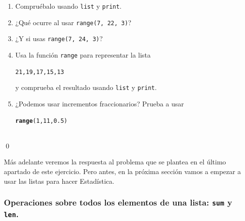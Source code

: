 \documentclass[10pt,a4paper]{article}\usepackage[]{graphicx}\usepackage[]{color}
\makeatletter
\newcommand{\hlnum}[1]{\textcolor[rgb]{0.686,0.059,0.569}{#1}}%
\newcommand{\hlstd}[1]{\textcolor[rgb]{0.345,0.345,0.345}{#1}}%
\newcommand{\hlkwd}[1]{\textcolor[rgb]{0.737,0.353,0.396}{\textbf{#1}}}%
\newenvironment{kframe}{%
 \def\at@end@of@kframe{}%
 \ifinner\ifhmode%
  \def\at@end@of@kframe{\end{minipage}}%
  \begin{minipage}{\columnwidth}%
 \fi\fi%
 \def\FrameCommand##1{\hskip\@totalleftmargin \hskip-\fboxsep
 \colorbox{shadecolor}{##1}\hskip-\fboxsep
     \hskip-\linewidth \hskip-\@totalleftmargin \hskip\columnwidth}%
 \MakeFramed {\advance\hsize-\width
   \@totalleftmargin\z@ \linewidth\hsize
   \@setminipage}}%
 {\par\unskip\endMakeFramed%
 \at@end@of@kframe}
\newenvironment{knitrout}{}{} %
\makeatother
\begin{document}
\begin{ejercicio}
\label{tut02:ejercicio14}
\quad
\begin{enumerate}
\item Compruébalo usando {\tt list} y {\tt print}.
\item ¿Qué ocurre al usar {\tt range(7, 22, 3)}?
\item ¿Y si usas {\tt range(7, 24, 3)}?
\item Usa la función {\tt range} para representar la lista
\begin{knitrout}
\color{fgcolor}\begin{kframe}
\begin{alltt}
21, 19, 17, 15, 13
\end{alltt}
\end{kframe}
\end{knitrout}
y comprueba el resultado usando {\tt list} y {\tt print}.
\item ¿Podemos usar incrementos fraccionarios? Prueba a usar
\begin{knitrout}
\color{fgcolor}\begin{kframe}
\begin{alltt}
\hlkwd{range}\hlstd{(}\hlnum{1}\hlstd{,} \hlnum{11}\hlstd{,} \hlnum{0.5}\hlstd{)}
\end{alltt}
\end{kframe}
\end{knitrout}
\end{enumerate}
\quad\\
\qed
\end{ejercicio}
Más adelante veremos la respuesta al problema que se plantea en el último apartado de este ejercicio. Pero antes, en la próxima sección vamos a empezar a usar las listas para hacer Estadística.

\subsubsection*{Operaciones sobre todos los elementos de una lista: {\tt sum} y {\tt len}.}
\label{tut02:subsubsec:operacionesTodosElementosLista}
\end{document}
